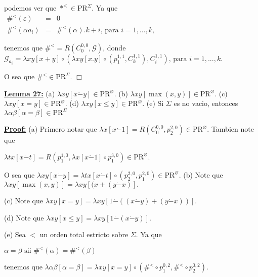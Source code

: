   podemos ver que \(\ast ^{< }\in \mathrm{PR}^{\Sigma }.\) Ya que
  \(\displaystyle \begin{array}{rcl} \#^{< }(\varepsilon ) & =& 0 \\ \#^{< }(\alpha a_{i}) & =& \#^{< }(\alpha ).k+i\text{, para }i=1,...,k, \end{array} \)

  tenemos que \(\#^{< }=R\left( C_{0}^{0,0},\mathcal{G}\right) \), donde
  \(\displaystyle \mathcal{G}_{a_{i}}=\lambda xy\left[ x+y\right] \circ \left( \lambda xy\left[ x.y\right] \circ \left( p_{1}^{1,1},C_{k}^{1,1}\right) ,C_{i}^{1,1}\right) \text{, para }i=1,...,k\text{.} \)

  O sea que \(\#^{< }\in \mathrm{PR}^{\Sigma }\). \(\Box\)

  \textbf{\underline{Lemma 27:}}
  (a) \(\lambda xy\left[ x\dot{-}y\right] \in \mathrm{PR}^{\varnothing }.\)
  (b) \(\lambda xy\left[ \max (x,y)\right] \in \mathrm{PR}^{\varnothing }.\)
  (c) \(\lambda xy\left[ x=y\right] \in \mathrm{PR}^{\varnothing }.\)
  (d) \(\lambda xy\left[ x\leq y\right] \in \mathrm{PR}^{\varnothing }.\)
  (e) Si \(\Sigma \) es no vacio, entonces \(\lambda \alpha \beta \left[ \alpha =\beta \right] \in \mathrm{PR}^{\Sigma }\)


  \textbf{\underline{Proof:}} (a) Primero notar que \(\lambda x\left[ x\dot{-}1\right] =R\left( C_{0}^{0,0},p_{2}^{2,0}\right) \in \mathrm{PR}^{\varnothing }.\) Tambien note que

  \(\displaystyle \lambda tx\left[ x\dot{-}t\right] =R\left( p_{1}^{1,0},\lambda x\left[ x\dot{ -}1\right] \circ p_{1}^{3,0}\right) \in \mathrm{PR}^{\varnothing }. \)

  O sea que \(\lambda xy\left[ x\dot{-}y\right] =\lambda tx\left[ x\dot{-}t \right] \circ \left( p_{2}^{2,0},p_{1}^{2,0}\right) \in \mathrm{PR} ^{\varnothing }.\)
  (b) Note que \(\lambda xy\left[ \max (x,y)\right] =\lambda xy\left[ (x+(y\dot{ -}x)\right] .\)

  (c) Note que \(\lambda xy\left[ x=y\right] =\lambda xy\left[ 1\dot{-}((x\dot{- }y)+(y\dot{-}x))\right] .\)

  (d) Note que \(\lambda xy\left[ x\leq y\right] =\lambda xy\left[ 1\dot{-}(x \dot{-}y)\right] .\)

  (e) Sea \(< \) un orden total estricto sobre \(\Sigma .\) Ya que

  \(\displaystyle \alpha =\beta \text{ sii }\#^{< }(\alpha )=\#^{< }(\beta ) \)

  tenemos que
  \(\displaystyle \lambda \alpha \beta \left[ \alpha =\beta \right] =\lambda xy\left[ x=y \right] \circ \left( \#^{< }\circ p_{1}^{0,2},\#^{< }\circ p_{2}^{0,2}\right) . \)

